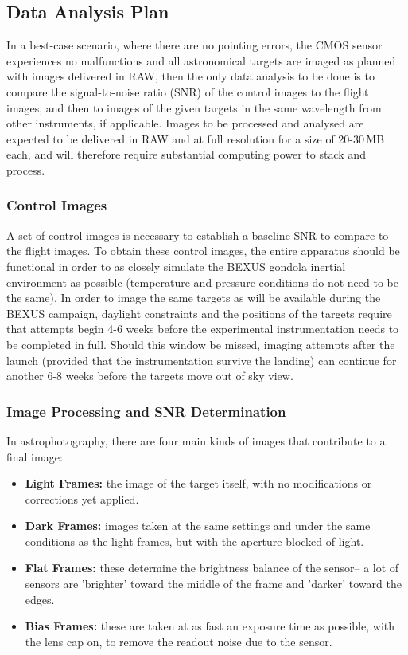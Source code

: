\subsection{Data Analysis Plan}

In a best-case scenario, where there are no pointing errors, the CMOS sensor experiences no malfunctions and all astronomical targets are imaged as planned with images delivered in RAW, then the only data analysis to be done is to compare the signal-to-noise ratio (SNR) of the control images to the flight images, and then to images of the given targets in the same wavelength from other instruments, if applicable.  Images to be processed and analysed are expected to be delivered in RAW and at full resolution for a size of 20-30\,MB each, and will therefore require substantial computing power to stack and process.

\subsubsection{Control Images}

A set of control images is necessary to establish a baseline SNR to compare to the flight images. To obtain these control images, the entire apparatus should be functional in order to as closely simulate the BEXUS gondola inertial environment as possible (temperature and pressure conditions do not need to be the same). In order to image the same targets as will be available during the BEXUS campaign, daylight constraints and the positions of the targets require that attempts begin 4-6 weeks before the experimental instrumentation needs to be completed in full. Should this window be missed, imaging attempts after the launch (provided that the instrumentation survive the landing) can continue for another 6-8 weeks before the targets move out of sky view.

\subsubsection{Image Processing and SNR Determination}

In astrophotography, there are four main kinds of images that contribute to a final image:
\begin{itemize}
    \item \textbf{Light Frames:} the image of the target itself, with no modifications or corrections yet applied.
    \item \textbf{Dark Frames:} images taken at the same settings and under the same conditions as the light frames, but with the aperture blocked of light.
    \item \textbf{Flat Frames:} these determine the brightness balance of the sensor-- a lot of sensors are 'brighter' toward the middle of the frame and 'darker' toward the edges.
    \item \textbf{Bias Frames:} these are taken at as fast an exposure time as possible, with the lens cap on, to remove the readout noise due to the sensor.
\end{itemize}

